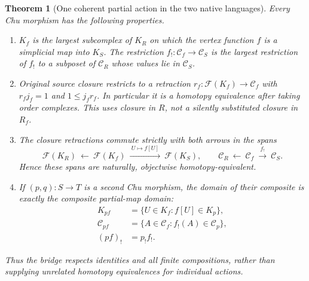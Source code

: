 \documentclass[11pt]{article}
\newtheorem{theorem}{Theorem}[section]
\theoremstyle{remark}
\begin{document}
\begin{theorem}[One coherent partial action in the two native languages]
\label{nb:partial-bridge}
Every Chu morphism has the following properties.
\begin{enumerate}
\item $K_f$ is the \emph{largest} subcomplex of $K_R$ on which the vertex
function $f$ is a simplicial map into $K_S$. The restriction
$f_!:\mathcal C_f\to\mathcal C_S$ is the largest restriction of $f_!$
to a subposet of $\mathcal C_R$ whose values lie in $\mathcal C_S$.
\item Original source closure restricts to a retraction
$r_f:\mathcal F(K_f)\to\mathcal C_f$ with
$r_fj_f=1$ and $1\leq j_fr_f$. In particular it is a homotopy
equivalence after taking order complexes. This uses closure in $R$,
not a silently substituted closure in $R_f$.
\item The closure retractions commute strictly with both arrows in the
spans
\[
 \mathcal F(K_R)\ \longleftarrow\ \mathcal F(K_f)
       \ \xrightarrow{\ U\mapsto f[U]\ }\ \mathcal F(K_S),
 \qquad
 \mathcal C_R\ \longleftarrow\ \mathcal C_f
       \ \xrightarrow{\ f_!\ }\ \mathcal C_S.
\]
Hence these spans are naturally, objectwise homotopy-equivalent.
\item If $(p,q):S\to T$ is a second Chu morphism, the domain of their
composite is exactly the composite partial-map domain:
\begin{align*}
 K_{pf}&=\{U\in K_f:f[U]\in K_p\},\\
 \mathcal C_{pf}&=\{A\in\mathcal C_f:f_!(A)\in\mathcal C_p\},\\
 (pf)_!&=p_!f_!.
\end{align*}
\end{enumerate}
Thus the bridge respects identities and all finite compositions, rather
than supplying unrelated homotopy equivalences for individual actions.
\end{theorem}
\end{document}
